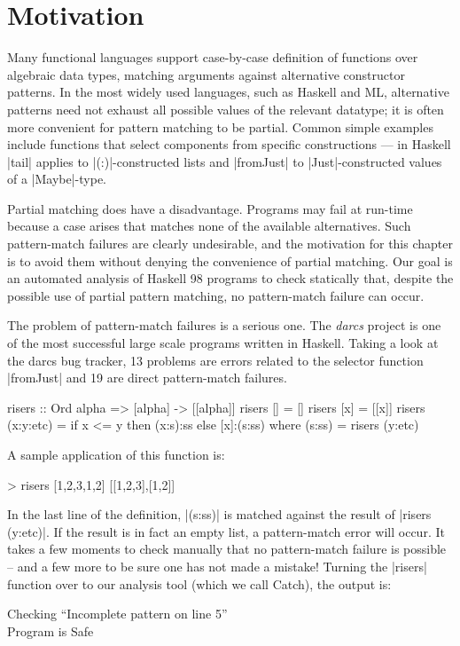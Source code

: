 \section{Motivation}
\label{secC:catch_intro}

Many functional languages support case-by-case definition of functions
over algebraic data types, matching arguments against alternative
constructor patterns.  In the most widely used languages, such as Haskell
and ML, alternative patterns need not exhaust all possible values of
the relevant datatype; it is often more convenient for pattern matching
to be partial.  Common simple examples include functions that select
components from specific constructions --- in Haskell |tail| applies
to |(:)|-constructed lists and |fromJust| to |Just|-constructed values of
a |Maybe|-type.

Partial matching does have a disadvantage.  Programs may fail at run-time
because a case arises that matches none of the available alternatives.
Such pattern-match failures are clearly undesirable, and the motivation
for this chapter is to avoid them without denying the convenience of
partial matching.  Our goal is an automated analysis of Haskell 98 programs
to check statically that, despite the possible use of partial pattern
matching, no pattern-match failure can occur.

The problem of pattern-match failures is a serious one. The \textit{darcs} project \cite{darcs} is one of the most successful large scale programs written in Haskell. Taking a look at the darcs bug tracker, 13 problems are errors related to the selector function |fromJust| and 19 are direct pattern-match failures.

\begin{example}
\label{exC:risers}
\begin{code}
risers :: Ord alpha => [alpha] -> [[alpha]]
risers [] = []
risers [x] = [[x]]
risers (x:y:etc) = if x <= y then (x:s):ss else [x]:(s:ss)
    where (s:ss) = risers (y:etc)
\end{code}

\noindent A sample application of this function is:

\ignore\begin{code}
> risers [1,2,3,1,2]
[[1,2,3],[1,2]]
\end{code}

\noindent In the last line of the definition, |(s:ss)| is matched against the result of |risers (y:etc)|. If the result is in fact an empty list, a pattern-match error will occur. It takes a few moments to check manually that no pattern-match failure is possible -- and a few more to be sure one has not made a mistake! Turning the |risers| function over to our analysis tool (which we call Catch), the output is:

\begin{console}
Checking ``Incomplete pattern on line 5'' \\
Program is Safe
\end{console}
\end{example}


